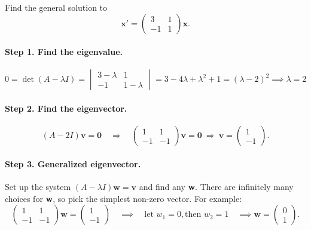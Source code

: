 \documentclass[11pt,letterpaper]{article}
\begin{document}

\begin{example}[4]{
Find the general solution to 
\[
\mathbf{x}' = \begin{pmatrix}3&1\\-1&1\end{pmatrix}\mathbf{x}.
\]
}
\paragraph{Step 1. Find the eigenvalue.}
$$0=\det(A-\lambda I)=\begin{vmatrix}
    3-\lambda & 1\\-1 & 1-\lambda
\end{vmatrix}=3-4\lambda +\lambda^2 +1=(\lambda-2)^2 \implies \lambda=2$$
\paragraph{Step 2. Find the eigenvector.}
\[
(A-2I)\mathbf{v}=\mathbf{0}
\quad\Rightarrow\quad
\begin{pmatrix}1&1\\-1&-1\end{pmatrix}\mathbf{v}=\mathbf{0}
\ \Rightarrow\ 
\mathbf{v}=
\begin{pmatrix}1\\-1\end{pmatrix}.
\]
\paragraph{Step 3. Generalized eigenvector.} Set up the system $(A-\lambda I)\textbf{w}=\textbf{v}$ and find any \textbf{w}. There are infinitely many choices for \textbf{w}, so pick the simplest non-zero vector. For example:
\[
\begin{pmatrix}1&1\\-1&-1\end{pmatrix}\mathbf{w}=\begin{pmatrix}1\\-1\end{pmatrix}
\quad\implies\quad
\text{let } w_1=0,\text{then }w_2=1 
\quad\implies 
\mathbf{w}=\begin{pmatrix}0\\1\end{pmatrix}.
\]

\end{example}
\end{document}
